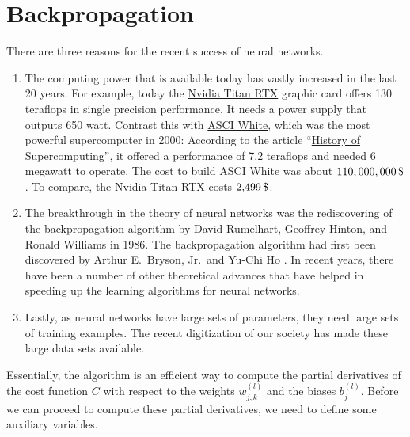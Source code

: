\section{Backpropagation}
There are three reasons for the recent success of neural networks.
\begin{enumerate}
\item The computing power that is available today has vastly increased in the last 20 years.
      For example, today the
      \href{https://www.nvidia.com/en-us/deep-learning-ai/products/titan-rtx/}{Nvidia Titan RTX}
      graphic card offers  130 teraflops in single precision performance.  It needs a power supply that
      outputs 650 watt.  Contrast this with \href{https://en.wikipedia.org/wiki/ASCI_White}{ASCI White}, which
      was the most powerful supercomputer in 2000: According to the article
      ``\href{https://en.wikipedia.org/wiki/History_of_supercomputing}{History of Supercomputing}'', 
      it  offered a performance of 7.2 teraflops and needed 6 megawatt to operate.  The cost to build ASCI
      White was about $110,000,000\,\symbol{36}$.   To compare, the Nvidia Titan RTX costs $2,\!499\,\symbol{36}$.
\item The breakthrough in the theory of neural networks was the rediscovering of the
      \href{https://en.wikipedia.org/wiki/Backpropagation}{backpropagation algorithm}  by
      David Rumelhart, Geoffrey Hinton, and Ronald Williams \cite{rumelhart:1986} in 1986.  
      The backpropagation algorithm had first been discovered by Arthur E.~Bryson, Jr.~and Yu-Chi Ho
      \cite{bryson:1969}.  In recent years, there have been a number of other theoretical advances that have
      helped in speeding up the learning algorithms for neural networks.
\item Lastly, as neural networks have large sets of parameters, they need large sets of training examples.  The
      recent digitization of our society has made these large data sets available.
\end{enumerate}
Essentially, the  algorithm is an efficient way to compute the partial derivatives of the
cost function $C$ with respect to the weights $w_{j,k}^{(l)}$ and the biases $b_j^{(l)}$.  Before we can
proceed to compute these partial derivatives, we need to define some auxiliary variables. 

